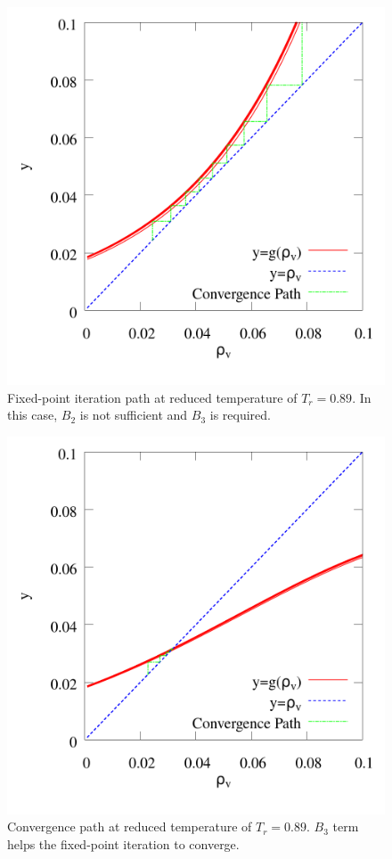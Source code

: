 \documentclass[5p,times]{elsarticle}
\begin{document}
\begin{figure}
\includegraphics[scale=0.25]{Figures/Diverge-C12-FTF-B2+15_rho-048030gcc.png}
\caption{Fixed-point iteration path at reduced temperature of $T_r=0.89$. In this case, $B_2$ is not sufficient and $B_3$ is required.}
\label{fig:Diverge-C12-FTF-B2+15_rho-048030gcc}
\end{figure}

\begin{figure}
\includegraphics[scale=0.25]{Figures/Converge-C12-FTT-B3+15-rho_048030gcc.png}
\caption{Convergence path at reduced temperature of $T_r=0.89$. $B_3$ term helps the fixed-point iteration to converge.}
\label{fig:Converge-C12-FTT-B3+15-rho_048030gcc}
\end{figure}
\end{document}
